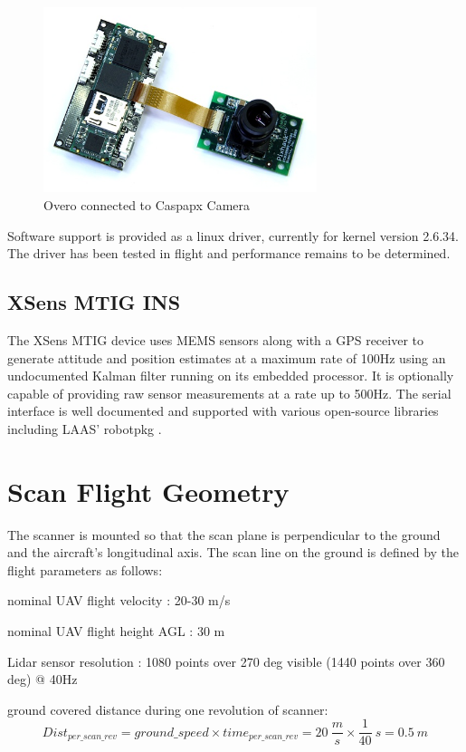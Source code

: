 \documentclass[a4paper,11pt]{report}
\begin{document}
\begin{figure}[ht]
 \centering
 \includegraphics[width=8cm]{overo_and_caspa.jpeg}
 \caption{Overo connected to Caspapx Camera}
 \label{fig:caspa}
\end{figure}

Software support is provided as a linux driver, currently for kernel version 2.6.34. The driver has been tested in flight and performance remains to be determined.

\subsection{XSens MTIG INS}
\label{MTIG}

The XSens MTIG device uses MEMS sensors along with a GPS receiver to generate attitude and position estimates at a maximum rate of 100Hz using an undocumented Kalman filter running on its embedded processor. It is optionally capable of providing raw sensor measurements at a rate up to 500Hz. The serial interface is well documented and supported with various open-source libraries including LAAS' robotpkg \cite{robotpkg}.


\section{Scan Flight Geometry}
\label{geometry}

The scanner is mounted so that the scan plane is perpendicular to the ground and the aircraft's longitudinal axis. The scan line on the ground is defined by the flight parameters as follows:

nominal UAV flight velocity : 20-30 m/s

nominal UAV flight height AGL : 30 m

Lidar sensor resolution : 1080 points over 270 deg visible (1440 points over 360 deg) @ 40Hz

ground covered distance during one revolution of scanner:
\begin{equation}
Dist_{per\_scan\_rev} = ground\_speed \times time_{per\_scan\_rev} = 20~\frac{m}{s} \times \frac{1}{40}~s = 0.5~m 
\end{equation}
\end{document}
